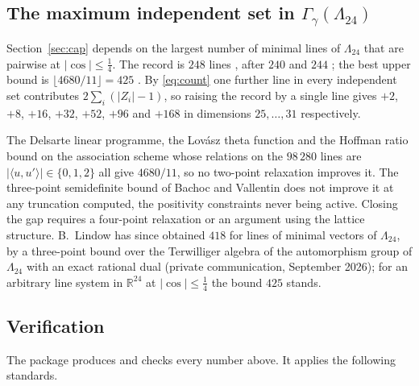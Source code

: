 \documentclass[11pt]{amsart}
\theoremstyle{remark}
\newcommand{\Leech}{\Lambda_{24}}
\newcommand{\ip}[2]{\langle #1,#2\rangle}
\newcommand{\R}{\mathbb{R}}
\begin{document}
\subsection{The maximum independent set in \texorpdfstring{$\Gamma_\gamma(\Leech)$}{Gamma(Leech)}}\label{ss:class}

Section~\ref{sec:cap} depends on the largest number of minimal lines of $\Leech$
that are pairwise at $|\cos|\le\tfrac14$. The record is $248$ lines
\cite{ma-etal2025}, after $240$ \cite{cohn-jiao-kumar-torquato2011} and $244$
\cite{kallal-kan-wang2017}; the best upper bound is $\lfloor 4680/11\rfloor=425$
\cite[\S7]{cohn-jiao-kumar-torquato2011}. By \eqref{eq:count} one further line in
every independent set contributes $2\sum_i(|Z_i|-1)$, so raising the record by a
single line gives $+2$, $+8$, $+16$, $+32$, $+52$, $+96$ and $+168$ in dimensions
$25,\dots,31$ respectively.

The Delsarte linear programme, the Lov\'asz theta function and the Hoffman ratio
bound on the association scheme whose relations on the $98\,280$ lines are
$|\ip{u}{u'}|\in\{0,1,2\}$ all give $4680/11$, so no two-point relaxation
improves it. The three-point semidefinite bound of Bachoc and
Vallentin \cite{bachoc-vallentin2008} does not improve it at any truncation
computed, the positivity constraints never being active. Closing the gap requires a four-point relaxation
or an argument using the lattice structure. B.~Lindow has since obtained $418$
for lines of minimal vectors of $\Leech$, by a three-point bound over the
Terwilliger algebra of the automorphism group of $\Leech$ with an exact rational
dual (private communication, September 2026); for an arbitrary line system in
$\R^{24}$ at $|\cos|\le\tfrac14$ the bound $425$ stands.

\subsection{Verification}\label{ss:verif}

The package \cite{repo} produces and checks every number above. It applies the
following standards.
\end{document}
